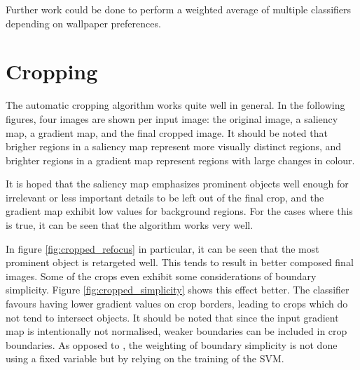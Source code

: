 Further work could be done to perform a weighted average of multiple classifiers
depending on wallpaper preferences.

\newpage
\section{Cropping\label{sec:qualitative_cropping}}

The automatic cropping algorithm works quite well in general.
In the following figures, four images are shown per input image: the original
image, a saliency map, a gradient map, and the final cropped image.
It should be noted that brigher regions in a saliency map represent more
visually distinct regions, and brighter regions in a gradient map represent
regions with large changes in colour.

It is hoped that the saliency map emphasizes prominent objects well enough for
irrelevant or less important details to be left out of the final crop, and the
gradient map exhibit low values for background regions.
For the cases where this is true, it can be seen that the algorithm works very
well.

In figure \ref{fig:cropped_refocus} in particular, it can be seen that the most
prominent object is retargeted well.
This tends to result in better composed final images.
Some of the crops even exhibit some considerations of boundary simplicity.
Figure \ref{fig:cropped_simplicity} shows this effect better.
The classifier favours having lower gradient values on crop borders, leading to
crops which do not tend to intersect objects.
It should be noted that since the input gradient map is intentionally not
normalised, weaker boundaries can be included in crop boundaries.
As opposed to \cite{fang2014automatic}, the weighting of boundary simplicity is
not done using a fixed variable but by relying on the training of the SVM.

